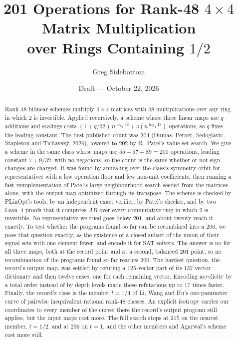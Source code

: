 \documentclass[11pt]{article}
\title{201 Operations for Rank-48 $4\times4$ Matrix Multiplication\\
over Rings Containing $1/2$}
\author{Greg Sidebottom}
\date{Draft --- October 22, 2026}
\theoremstyle{remark}
\begin{document}
\maketitle

\begin{abstract}
Rank-48 bilinear schemes multiply $4\times4$ matrices with $48$
multiplications over any ring in which $2$ is invertible.  Applied
recursively, a scheme whose three linear maps use $q$ additions and
scalings costs $(1+q/32)\,n^{\log_4 48}+o(n^{\log_4 48})$ operations,
so $q$ fixes the leading constant.  The best published count was $204$
(Dumas, Pernet, Sedoglavic, Stapleton and Tichavsk\'y, 2026), lowered to
$202$ by R.~Patel's value-set search.  We give a scheme in the same
class whose maps use $55+57+89=201$ operations, leading constant
$7+9/32$, with no negations, so the count is the same whether or not
sign changes are charged.  It was found by annealing over the class's
symmetry orbit for representatives with a low operation floor and few
non-unit coefficients, then running a fast reimplementation of Patel's
large-neighbourhood search seeded from the matrices alone, with the
output map optimized through its transpose.  The scheme is checked by
PLinOpt's tools, by an independent exact verifier, by Patel's checker,
and by two Lean~4 proofs that it computes $AB$ over every commutative
ring in which $2$ is invertible.  No representative we tried goes below
$201$, and about twenty reach it exactly.  To test whether the programs
found so far can be recombined into a $200$, we pose that question
exactly, as the existence of a closed subset of the union of their
signal sets with one element fewer, and encode it for SAT solvers.  The
answer is no for all three maps, both at the record point and at a
second, balanced $201$ point, so no recombination of the programs found
so far reaches $200$.  The hardest question, the record's output map,
was settled by refuting a $125$-vector part of its $137$-vector
dictionary and then twelve cases, one for each remaining vector.
Encoding acyclicity by a total order instead of by depth levels made
these refutations up to $17$ times faster.  Finally, the record's class
is the member $t=1/4$ of Li, Wang and Hu's one-parameter curve of
pairwise inequivalent rational rank-48 classes.  An explicit isotropy
carries our coordinates to every member of the curve; there the record's
output program still applies, but the input maps cost more.  The full
search stops at $215$ on the nearest member, $t=1/2$, and at $236$ on
$t=1$, and the other members and Agarwal's scheme cost more still.
\end{abstract}
\end{document}
